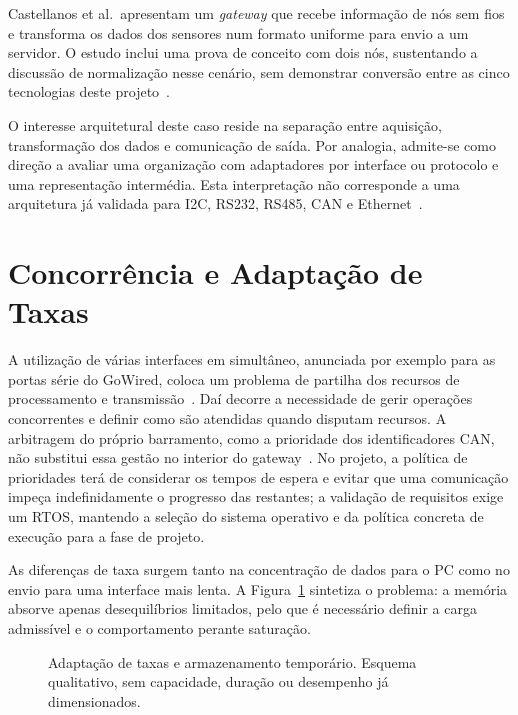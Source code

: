 Castellanos et al.\ apresentam um \textit{gateway} que recebe informação
de nós sem fios e transforma os dados dos sensores num formato uniforme
para envio a um servidor. O estudo inclui uma prova de conceito com
dois nós, sustentando a discussão de normalização nesse cenário,
sem demonstrar conversão entre as cinco tecnologias deste
projeto~\cite{castellanos_gateway_2021}.

O interesse arquitetural deste caso reside na separação entre aquisição,
transformação dos dados e comunicação de saída. Por analogia, admite-se
como direção a avaliar uma organização com adaptadores por interface
ou protocolo e uma representação intermédia. Esta interpretação
não corresponde a uma arquitetura já validada para I2C, RS232, RS485,
CAN e Ethernet~\cite{castellanos_gateway_2021}.

\section{Concorrência e Adaptação de Taxas}

A utilização de várias interfaces em simultâneo, anunciada por exemplo
para as portas série do GoWired, coloca um problema de partilha dos
recursos de processamento e transmissão~\cite{domatic_gowired}.
Daí decorre a necessidade de gerir operações concorrentes e definir
como são atendidas quando disputam recursos. A arbitragem do próprio
barramento, como a prioridade dos identificadores CAN, não substitui
essa gestão no interior do gateway~\cite{cia_can_cc}. No projeto, a
política de prioridades terá de considerar os tempos de espera e evitar
que uma comunicação impeça indefinidamente o progresso das restantes;
a validação de requisitos exige um RTOS, mantendo a seleção do sistema
operativo e da política concreta de execução para a fase de projeto.

As diferenças de taxa surgem tanto na concentração de dados para o
PC como no envio para uma interface mais lenta. A
Figura~\ref{fig:buffering} sintetiza o problema: a memória absorve apenas
desequilíbrios limitados, pelo que é necessário definir a carga admissível
e o comportamento perante saturação.

\begin{figure}[htbp]
    \centering
    \caption[Adaptação de taxas e armazenamento temporário.]{Adaptação de taxas e armazenamento temporário. Esquema qualitativo, sem capacidade, duração ou desempenho já dimensionados.}
    \label{fig:buffering}
\end{figure}

